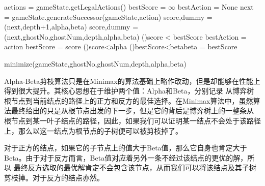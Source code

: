\begin{procedure}[h]
    \;
    actions = gameState.getLegalActions()\;
    {}
    bestScore = $\infty$\;
    bestAction = None\;
    {
        next = gameState.generateSuccessor(gameState,action)\;
        {
            score,dummy = \maximize(next,depth+1,alpha,beta)
        }
        {
        score,dummy = \minimize(next,ghostNo,ghostNum,depth,alpha,beta)
        }
        \If(){score < bestScore}
        {
            bestAction = action\;
            bestScore = score\;
        }
        \lIf(){score<alpha}{}
        \lIf(){bestScore<beta}{beta = bestScore}
    }
    \caption{minimize(gameState,ghostNo,ghostNum,depth,alpha,beta)}
\end{procedure}
Alpha-Beta剪枝算法只是在Minimax的算法基础上略作改动，但是却能够在性能上得到很大提升。其核心思想在于维护两个值：Alpha和Beta，分别记录
从博弈树根节点到当前结点的路径上的正方和反方的最佳选择。在Minimax算法中，虽然算法最终给出的只是从根节点出发的下一步，但是它的背后是博弈树上的一整条从
根节点到某一叶子结点的路径，因此，如果我们可以证明某一结点不会处于该路径上，那么以这一结点为根节点的子树便可以被剪枝掉了。

对于正方的结点，如果它的子节点上的值大于Beta值，那么它自身也肯定大于Beta。由于对于反方而言，Beta值对应着另外一条不经过该结点的更优的解，所以
最终反方选取的最优解肯定不会包含该节点，从而我们可以将该结点及其子树剪枝掉。对于反方的结点亦然。
